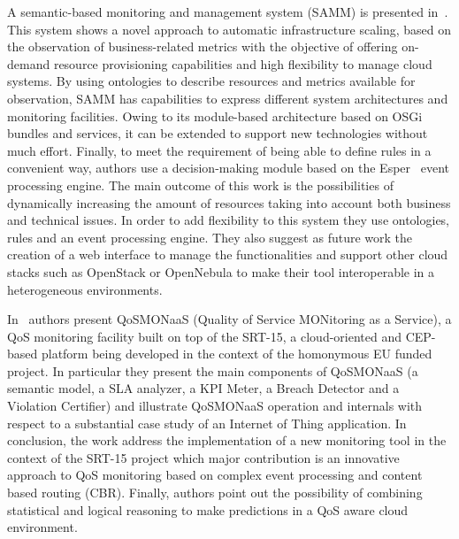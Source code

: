 A semantic-based monitoring and management system (SAMM) is presented in~\cite{fg-2266}. 
This system shows a novel approach to automatic infrastructure scaling, based on 
the observation of business-related metrics with the objective of offering 
on-demand resource provisioning capabilities and high flexibility to manage 
cloud systems. By using ontologies to describe resources and metrics available 
for observation, SAMM has capabilities to express different system architectures 
and monitoring facilities. Owing to its module-based architecture based on OSGi 
bundles and services, it can be extended to support new technologies without 
much effort. Finally, to meet the requirement of being able to define rules in a 
convenient way, authors use a decision-making module based on the Esper~\cite{esper-project} event 
processing engine. The main outcome of this work is the possibilities of 
dynamically increasing the amount of resources taking into account both business 
and technical issues. In order to add flexibility to this system they use 
ontologies, rules and an event processing engine. They also suggest as future 
work the creation of a web interface to manage the functionalities and support 
other cloud stacks such as OpenStack or OpenNebula to make their tool 
interoperable in a heterogeneous environments.


In~\cite{srt-15} authors present QoSMONaaS (Quality of Service MONitoring as a Service), 
a QoS monitoring facility built on top of the SRT-15, a cloud-oriented and 
CEP-based platform being developed in the context of the homonymous EU funded 
project. In particular they present the main components of QoSMONaaS (a semantic 
model, a SLA analyzer, a KPI Meter, a Breach Detector and a Violation Certifier) 
and illustrate QoSMONaaS operation and internals with respect to a substantial 
case study of an Internet of Thing application. In conclusion, the work address 
the implementation of a new monitoring tool in the context of the SRT-15 project 
which major contribution is an innovative approach to QoS monitoring based on 
complex event processing and content based routing (CBR). Finally, authors point 
out the possibility of combining statistical and logical reasoning to make 
predictions in a QoS aware cloud environment.


